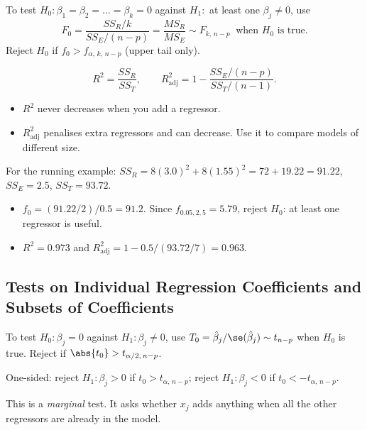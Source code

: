 \begin{theorem}\label{thm:mlr-F}
To test $H_0:\beta_1=\beta_2=\dots=\beta_k=0$ against $H_1:$ at least one $\beta_j\ne0$, use
\[ F_0=\frac{SS_R/k}{SS_E/(n-p)}=\frac{MS_R}{MS_E}\sim F_{k,\,n-p}\ \text{ when }H_0\text{ is true.} \]
Reject $H_0$ if $f_0>f_{\alpha,\,k,\,n-p}$ (upper tail only).
\end{theorem}

\begin{definition}
\[ R^2=\frac{SS_R}{SS_T},\qquad R^2_{\mathrm{adj}}=1-\frac{SS_E/(n-p)}{SS_T/(n-1)}. \]
\begin{itemize}
  \item $R^2$ never decreases when you add a regressor.
  \item $R^2_{\mathrm{adj}}$ penalises extra regressors and can decrease. Use it to compare models of different size.
\end{itemize}
\end{definition}

\begin{example}
For the running example: $SS_R=8(3.0)^2+8(1.55)^2=72+19.22=91.22$, $SS_E=2.5$, $SS_T=93.72$.
\begin{itemize}
  \item $f_0=(91.22/2)/0.5=91.2$. Since $f_{0.05,2,5}=5.79$, reject $H_0$: at least one regressor is useful.
  \item $R^2=0.973$ and $R^2_{\mathrm{adj}}=1-0.5/(93.72/7)=0.963$.
\end{itemize}
\end{example}

\subsection{Tests on Individual Regression Coefficients and Subsets of Coefficients}

\begin{theorem}\label{thm:mlr-t}
To test $H_0:\beta_j=0$ against $H_1:\beta_j\ne0$, use $T_0=\hat\beta_j/\se(\hat\beta_j)\sim t_{n-p}$ when $H_0$ is true. Reject if $\abs{t_0}>t_{\alpha/2,\,n-p}$.

One-sided: reject $H_1:\beta_j>0$ if $t_0>t_{\alpha,\,n-p}$; reject $H_1:\beta_j<0$ if $t_0<-t_{\alpha,\,n-p}$.
\end{theorem}

This is a \emph{marginal} test. It asks whether $x_j$ adds anything when all the other regressors are already in the model.

